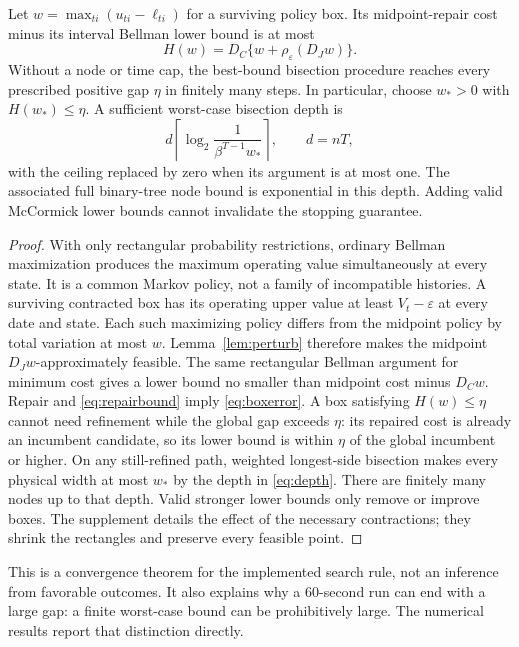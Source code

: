 \begin{proposition}\label{prop:spatial}
Let $w=\max_{ti}(u_{ti}-\ell_{ti})$ for a surviving policy box. Its midpoint-repair cost minus its interval Bellman lower bound is at most
\begin{equation}\label{eq:boxerror}
 H(w)=D_C\{w+\rho_\varepsilon(D_Jw)\}.
\end{equation}
Without a node or time cap, the best-bound bisection procedure reaches every prescribed positive gap $\eta$ in finitely many steps. In particular, choose $w_*>0$ with $H(w_*)\leq\eta$. A sufficient worst-case bisection depth is
\begin{equation}\label{eq:depth}
 d\left\lceil\log_2\frac{1}{\beta^{T-1}w_*}\right\rceil,
 \qquad d=nT,
\end{equation}
with the ceiling replaced by zero when its argument is at most one. The associated full binary-tree node bound is exponential in this depth. Adding valid McCormick lower bounds cannot invalidate the stopping guarantee.
\end{proposition}
\begin{proof}
With only rectangular probability restrictions, ordinary Bellman maximization produces the maximum operating value simultaneously at every state. It is a common Markov policy, not a family of incompatible histories. A surviving contracted box has its operating upper value at least $V_t-\varepsilon$ at every date and state. Each such maximizing policy differs from the midpoint policy by total variation at most $w$. Lemma~\ref{lem:perturb} therefore makes the midpoint $D_Jw$-approximately feasible. The same rectangular Bellman argument for minimum cost gives a lower bound no smaller than midpoint cost minus $D_Cw$. Repair and \eqref{eq:repairbound} imply \eqref{eq:boxerror}. A box satisfying $H(w)\leq\eta$ cannot need refinement while the global gap exceeds $\eta$: its repaired cost is already an incumbent candidate, so its lower bound is within $\eta$ of the global incumbent or higher. On any still-refined path, weighted longest-side bisection makes every physical width at most $w_*$ by the depth in \eqref{eq:depth}. There are finitely many nodes up to that depth. Valid stronger lower bounds only remove or improve boxes. The supplement details the effect of the necessary contractions; they shrink the rectangles and preserve every feasible point.
\end{proof}

This is a convergence theorem for the implemented search rule, not an inference from favorable outcomes. It also explains why a 60-second run can end with a large gap: a finite worst-case bound can be prohibitively large. The numerical results report that distinction directly.

